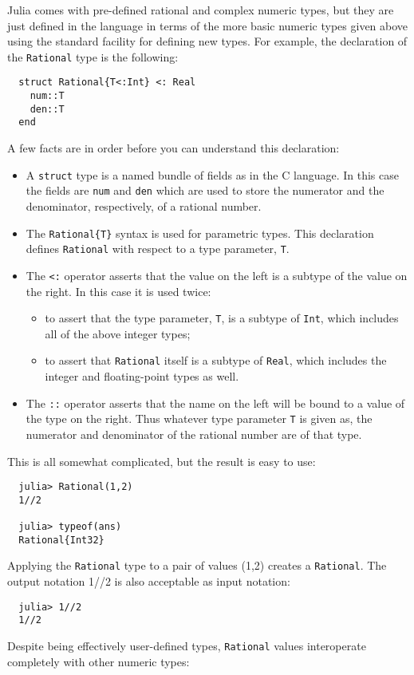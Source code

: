 \documentclass{article}
\begin{document}
Julia comes with pre-defined rational and complex numeric types, but they are just defined in the language in terms of the more basic numeric types given above using the standard facility for defining new types. For example, the declaration of the \verb|Rational| type is the following:
\begin{verbatim}
  struct Rational{T<:Int} <: Real
    num::T
    den::T
  end
\end{verbatim}
A few facts are in order before you can understand this declaration:
\begin{itemize}
\item A \verb|struct| type is a named bundle of fields as in the C language. In this case the fields are \verb|num| and \verb|den| which are used to store the numerator and the denominator, respectively, of a rational number.
\item The \verb|Rational{T}| syntax is used for parametric types. This declaration defines \verb|Rational| with respect to a type parameter, \verb|T|.
\item The \verb|<:| operator asserts that the value on the left is a subtype of the value on the right. In this case it is used twice:
  \begin{itemize}
    \item to assert that the type parameter, \verb|T|, is a subtype of \verb|Int|, which includes all of the above integer types;
    \item to assert that \verb|Rational| itself is a subtype of \verb|Real|, which includes the integer and floating-point types as well.
  \end{itemize}
\item The \verb|::| operator asserts that the name on the left will be bound to a value of the type on the right. Thus whatever type parameter \verb|T| is given as, the numerator and denominator of the rational number are of that type.
\end{itemize}
This is all somewhat complicated, but the result is easy to use:
\begin{verbatim}
  julia> Rational(1,2)
  1//2

  julia> typeof(ans)
  Rational{Int32}
\end{verbatim}
Applying the \verb|Rational| type to a pair of values (1,2) creates a \verb|Rational|. The output notation 1//2 is also acceptable as input notation:
\begin{verbatim}
  julia> 1//2
  1//2
\end{verbatim}
Despite being effectively user-defined types, \verb|Rational| values interoperate completely with other numeric types:
\end{document}
